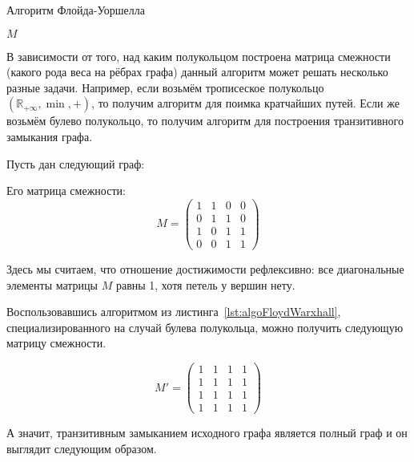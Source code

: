 \begin{algorithm}
\begin{algorithmic}[1]
\caption{Алгоритм Флойда-Уоршелла}
\label{lst:algoFloydWarxhall}
        \EndFor
      \EndFor
    \EndFor
\State \Return $M$
\EndFunction
\end{algorithmic}
\end{algorithm}

В зависимости от того, над каким полукольцом построена матрица смежности (какого рода веса на рёбрах графа) данный алгоритм может решать несколько разные задачи. Например, если возьмём трописеское полукольцо $(\mathbb{R}_{+\infty}, \min, +)$, то получим алгоритм для поимка кратчайших путей. Если же возьмём булево полукольцо, то получим алгоритм для построения транзитивного замыкания графа.

\begin{example}
  Пусть дан следующий граф:
  \begin{center}
    
  \end{center}

  Его матрица смежности:
  $$ M = 
  \begin{pmatrix}
    1 & 1 & 0 & 0 \\
    0 & 1 & 1 & 0 \\
    1 & 0 & 1 & 1 \\
    0 & 0 & 1 & 1
  \end{pmatrix}
  $$

  Здесь мы считаем, что отношение достижимости рефлексивно: все диагональные элементы матрицы $M$ равны 1, хотя петель у вершин нету. 

  Воспользовавшись алгоритмом из листинга~\ref{lst:algoFloydWarxhall}, специализированного на случай булева полукольца, можно получить следующую матрицу смежности.

  $$ M' = 
  \begin{pmatrix}
    1 & 1 & 1 & 1 \\
    1 & 1 & 1 & 1 \\
    1 & 1 & 1 & 1 \\
    1 & 1 & 1 & 1
  \end{pmatrix}
  $$

  А значит, транзитивным замыканием исходного графа является полный граф и он выглядит следующим образом.
  
  \begin{center}
    
  \end{center}

\end{example}


